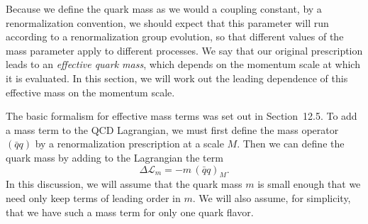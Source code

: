 Because we define the quark mass as we would a coupling constant, by a
renormalization convention, we should expect that this parameter will run
according to a renormalization group evolution, so that different values of
the mass parameter apply to different processes.  We say that our original
prescription leads to an \emph{effective quark mass}, which depends on the
momentum scale at which it is evaluated.  In this section, we will work out
the leading dependence of this effective mass on the momentum scale.

The basic formalism for effective mass terms was set out in Section~12.5.
To add a mass term to the QCD Lagrangian, we must first define the mass
operator $(\bar{q}q)$ by a renormalization prescription at a scale $M$.  Then
we can define the quark mass by adding to the Lagrangian the term
\begin{equation}
  \Delta\mathcal{L}_m = -m\,(\bar{q}q)_M .
  \label{eq:18.1}
\end{equation}
In this discussion, we will assume that the quark mass $m$ is small enough
that we need only keep terms of leading order in $m$.  We will also assume,
for simplicity, that we have such a mass term for only one quark flavor.

